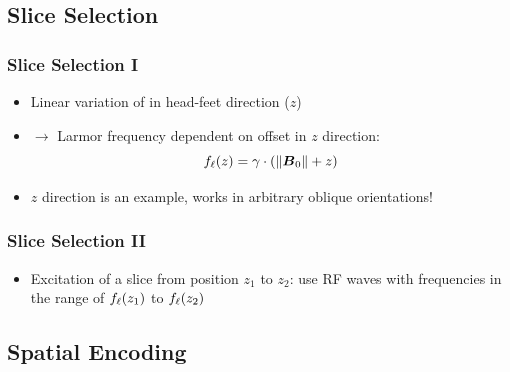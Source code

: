\subsection{Slice Selection} %
\label{sub:slice_selection}

\begin{frame}
	\frametitle{Slice Selection I}
	
	\begin{itemize}
		\item Linear variation of  in head-feet direction ($z$)
		\item $\rightarrow$ Larmor frequency \larmorfreq{} dependent on offset in $z$ direction:
		$$f_\ell(z) = \gamma \cdot \left( \Vert \boldsymbol{B}_{0} \Vert + z \right)$$
	\end{itemize}
	
	\begin{center}
		\begingroup
		
		\endgroup
	\end{center}
	
	\begin{itemize}
		\item $z$ direction is an example, works in arbitrary oblique orientations!
	\end{itemize}
\end{frame}

\begin{frame}
	\frametitle{Slice Selection II}
	
	\begin{itemize}
		\item Excitation of a slice from position $z_1$ to $z_2$: use RF waves with frequencies in the range of $f_\ell(z_1)$ to $f_\ell(z_2)$
	\end{itemize}
	
	\begin{center}
		\begingroup
		
		\endgroup
	\end{center}
\end{frame}




\subsection{Spatial Encoding} %
\label{sub:spatial_encoding}

